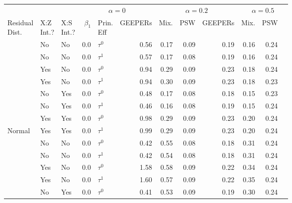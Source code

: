 
\begin{tabular}[t]{lllrlrrrrrr}
\toprule
\multicolumn{3}{c}{ } & \multicolumn{3}{c}{$\alpha=0$} & \multicolumn{3}{c}{$\alpha=0.2$} & \multicolumn{3}{c}{$\alpha=0.5$} \\
\cmidrule(l{3pt}r{3pt}){4-6} \cmidrule(l{3pt}r{3pt}){7-9} \cmidrule(l{3pt}r{3pt}){10-12}
\makecell[l]{Residual\\Dist.} & \makecell[c]{X:Z\\Int.?} & \makecell[r]{X:S\\Int.?} & $\beta_1$ & \makecell[c]{Prin.\\Eff} & GEEPERs & Mix. & PSW & GEEPERs & Mix. & PSW\\
\midrule
 & No & No & 0.0 & $\tau^0$ & 0.56 & 0.17 & 0.09 & 0.19 & 0.16 & 0.24\\

 & No & No & 0.0 & $\tau^1$ & 0.57 & 0.17 & 0.08 & 0.19 & 0.16 & 0.24\\

 & Yes & No & 0.0 & $\tau^0$ & 0.94 & 0.29 & 0.09 & 0.23 & 0.18 & 0.24\\

 & Yes & No & 0.0 & $\tau^1$ & 0.94 & 0.30 & 0.09 & 0.23 & 0.18 & 0.23\\

 & No & Yes & 0.0 & $\tau^0$ & 0.48 & 0.17 & 0.08 & 0.18 & 0.15 & 0.23\\

 & No & Yes & 0.0 & $\tau^1$ & 0.46 & 0.16 & 0.08 & 0.19 & 0.15 & 0.24\\

 & Yes & Yes & 0.0 & $\tau^0$ & 0.98 & 0.29 & 0.09 & 0.23 & 0.20 & 0.24\\

\multirow{-8}{*}{\raggedright\arraybackslash Normal} & Yes & Yes & 0.0 & $\tau^1$ & 0.99 & 0.29 & 0.09 & 0.23 & 0.20 & 0.24\\
\cmidrule{1-11}
 & No & No & 0.0 & $\tau^0$ & 0.42 & 0.55 & 0.08 & 0.18 & 0.31 & 0.24\\

 & No & No & 0.0 & $\tau^1$ & 0.42 & 0.54 & 0.08 & 0.18 & 0.31 & 0.24\\

 & Yes & No & 0.0 & $\tau^0$ & 1.58 & 0.58 & 0.09 & 0.22 & 0.34 & 0.24\\

 & Yes & No & 0.0 & $\tau^1$ & 1.60 & 0.57 & 0.09 & 0.22 & 0.35 & 0.24\\

 & No & Yes & 0.0 & $\tau^0$ & 0.41 & 0.53 & 0.09 & 0.19 & 0.30 & 0.24\\


\end{tabular}
